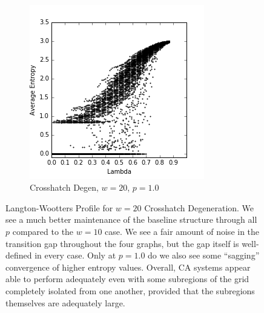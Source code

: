 \documentclass[a4paper,11pt]{report}
\begin{document}
\begin{figure}[htp]
\begin{subfigure}[t]{0.4\textwidth}
  \end{subfigure}
~
\begin{subfigure}[t]{0.4\textwidth}
  \centering
  \includegraphics[width=\textwidth]{ch6_figs/ch_w20_p100_entropy_scatter}
  \caption{Crosshatch Degen, $w=20$, $p=1.0$}
  \label{fig:lw_w20_p100}
  \end{subfigure}

\caption[Crosshatch Langton-Wootters Profile, $w=20$]{
  Langton-Wootters Profile for $w=20$ Crosshatch Degeneration. We see a much better maintenance of the baseline structure through all $p$ compared to the $w=10$ case. We see a fair amount of noise in the transition gap throughout the four graphs, but the gap itself is well-defined in every case. Only at $p=1.0$ do we also see some ``sagging'' convergence of higher entropy values. Overall, CA systems appear able to perform adequately even with some subregions of the grid completely isolated from one another, provided that the subregions themselves are adequately large.
}
\label{fig:lw_ch_20}
\end{figure}
\end{document}
